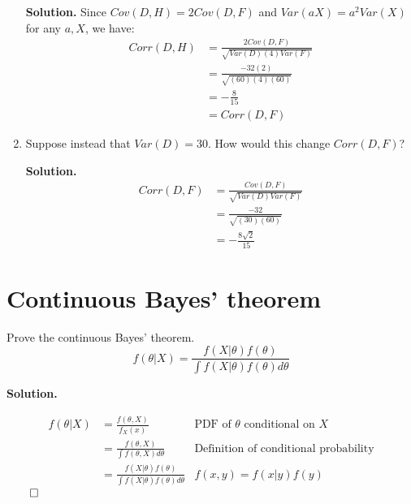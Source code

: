 \documentclass[12pt]{article}
\begin{document}
\begin{enumerate}
    \textbf{Solution.} Since $Cov(D,H)=2Cov(D,F)$ and $Var(aX)=a^2Var(X)$ for any $a,X$, we have:
    \begin{align*}
        Corr(D,H) &= \frac{2Cov(D,F)}{\sqrt{Var(D)(4)Var(F)}}
        \\ &= \frac{-32(2)}{\sqrt{(60)(4)(60)}}
        \\ &= -\frac{8}{15}
        \\ &= Corr(D,F)
    \end{align*}

    \item Suppose instead that $Var(D)=30$. How would this change $Corr(D,F)$?

    \textbf{Solution.}
    \begin{align*}
        Corr(D,F) &= \frac{Cov(D,F)}{\sqrt{Var(D)Var(F)}}
        \\ &= \frac{-32}{\sqrt{(30)(60)}}
        \\ &= -\frac{8\sqrt{2}}{15}
    \end{align*}
    
\end{enumerate}

\section{Continuous Bayes' theorem}
Prove the continuous Bayes' theorem.
\[ f(\theta | X) = \frac{f(X|\theta) f(\theta)}{\int f(X|\theta) f(\theta)d\theta}\]

\textbf{Solution.}

\begin{align*}
    f(\theta | X) &= \frac{f(\theta,X)}{f_X(x)} & \text{PDF of }\theta \text{ conditional on }X
    \\ &= \frac{f(\theta,X)}{\int f(\theta,X)d\theta} & \text{Definition of conditional probability}
    \\ &= \frac{f(X|\theta)f(\theta)}{\int f(X|\theta)f(\theta)d\theta} & f(x,y) = f(x|y)f(y)
\end{align*}
$\qed$
\end{document}
